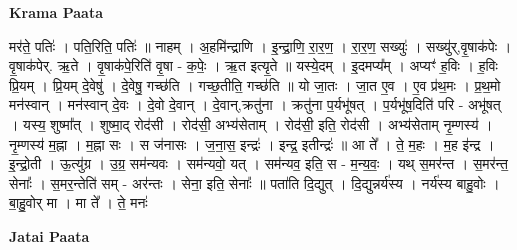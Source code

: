 \documentclass[17pt]{extarticle}
\begin{document}
\textbf{Krama Paata} \newline

मर॑ते॒ पतिः॑ । पति॒रिति॒ पतिः॑ ॥ नाहम् । अ॒हमि॑न्द्राणि । इ॒न्द्रा॒णि॒ रा॒र॒ण॒ । रा॒र॒ण॒ सख्युः॑ । सख्यु॑र्,वृ॒षाक॑पेः । वृ॒षाक॑पेर्. ऋ॒ते । वृ॒षाक॑पे॒रिति॑ वृ॒षा - क॒पेः॒ । ऋ॒त इत्यृ॒ते ॥ यस्ये॒दम् । इ॒दमप्य᳚म् । अप्यꣳ॑ ह॒विः । ह॒विः प्रि॒यम् । प्रि॒यम् दे॒वेषु॑ । दे॒वेषु॒ गच्छ॑ति । गच्छ॒तीति॒ गच्छ॑ति ॥ यो जा॒तः । जा॒त ए॒व । ए॒व प्र॑थ॒मः । प्र॒थ॒मो मन॑स्वान् । मन॑स्वान् दे॒वः । दे॒वो दे॒वान् । दे॒वान्,क्रतु॑ना । क्रतु॑ना प॒र्यभू॑षत् । प॒र्यभू॑ष॒दिति॑ परि - अभू॑षत् । यस्य॒ शुष्मा᳚त् । शुष्मा॒द् रोद॑सी । रोद॑सी॒ अभ्य॑सेताम् । रोद॑सी॒ इति॒ रोद॑सी । अभ्य॑सेताम् नृ॒म्णस्य॑ । नृ॒म्णस्य॑ म॒ह्ना । म॒ह्ना सः । स ज॑नासः । ज॒ना॒स॒ इन्द्रः॑ । इन्द्र॒ इतीन्द्रः॑ ॥ आ ते᳚ । ते॒ म॒हः । म॒ह इ॑न्द्र । इ॒न्द्रो॒ती । ऊ॒त्यु॑ग्र । उ॒ग्र॒ सम॑न्यवः । सम॑न्यवो॒ यत् । सम॑न्यव॒ इति॒ स - म॒न्य॒वः॒ । यथ् स॒मर॑न्त । स॒मर॑न्त॒ सेनाः᳚ । स॒मर॒न्तेति॑ सम् - अर॑न्तः । सेना॒ इति॒ सेनाः᳚ ॥ पता॑ति दि॒द्युत् । दि॒द्युन्नर्य॑स्य । नर्य॑स्य बाहु॒वोः । बा॒हु॒वोर् मा । मा ते᳚ । ते॒ मनः॑ \newline

\textbf{Jatai Paata} \newline
\end{document}
